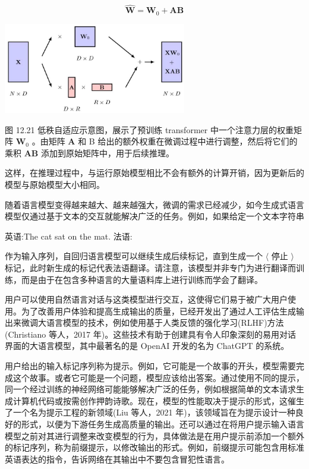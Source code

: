 \documentclass[10pt]{article}
\begin{document}
\[
\widehat{\mathbf{W}} = {\mathbf{W}}_{0} + \mathbf{{AB}} \tag{12.36}
\]

\begin{center}
\includegraphics[max width=0.6\textwidth]{images/0194e279-9b28-703a-88f4-c3ac21e2010d_412_619_345_853_424_0.jpg}
\end{center}
\hspace*{3em} 

图 12.21 低秩自适应示意图，展示了预训练 transformer 中一个注意力层的权重矩阵 \({\mathbf{W}}_{0}\) 。由矩阵 \(\mathbf{A}\) 和 B 给出的额外权重在微调过程中进行调整，然后将它们的乘积 \(\mathbf{{AB}}\) 添加到原始矩阵中，用于后续推理。

这样，在推理过程中，与运行原始模型相比不会有额外的计算开销，因为更新后的模型与原始模型大小相同。

随着语言模型变得越来越大、越来越强大，微调的需求已经减少，如今生成式语言模型仅通过基于文本的交互就能解决广泛的任务。例如，如果给定一个文本字符串

英语:The cat sat on the mat. 法语:

作为输入序列，自回归语言模型可以继续生成后续标记，直到生成一个 \(\langle\) 停止 \(\rangle\) 标记，此时新生成的标记代表法语翻译。请注意，该模型并非专门为进行翻译而训练，而是由于在包含多种语言的大量语料库上进行训练而学会了翻译。

用户可以使用自然语言对话与这类模型进行交互，这使得它们易于被广大用户使用。为了改善用户体验和提高生成输出的质量，已经开发出了通过人工评估生成输出来微调大语言模型的技术，例如使用基于人类反馈的强化学习(RLHF)方法(Christiano 等人，2017 年)。这些技术有助于创建具有令人印象深刻的易用对话界面的大语言模型，其中最著名的是 OpenAI 开发的名为 ChatGPT 的系统。

用户给出的输入标记序列称为提示。例如，它可能是一个故事的开头，模型需要完成这个故事。或者它可能是一个问题，模型应该给出答案。通过使用不同的提示，同一个经过训练的神经网络可能能够解决广泛的任务，例如根据简单的文本请求生成计算机代码或按需创作押韵诗歌。现在，模型的性能取决于提示的形式，这催生了一个名为提示工程的新领域(Liu 等人，2021 年)，该领域旨在为提示设计一种良好的形式，以便为下游任务生成高质量的输出。还可以通过在将用户提示输入语言模型之前对其进行调整来改变模型的行为，具体做法是在用户提示前添加一个额外的标记序列，称为前缀提示，以修改输出的形式。例如，前缀提示可能包含用标准英语表达的指令，告诉网络在其输出中不要包含冒犯性语言。
\end{document}
